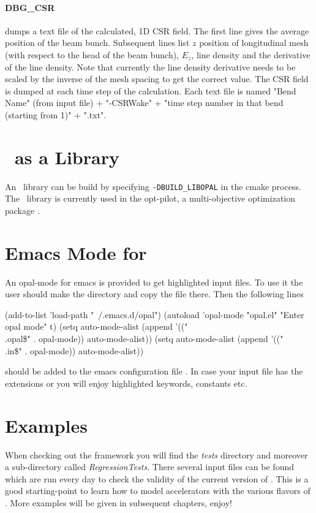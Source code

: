 \paragraph{DBG\_CSR} dumps a text file of the calculated, 1D CSR field. The first line gives the average position of the beam bunch.
Subsequent lines list $z$ position of longitudinal mesh (with respect to the head of the beam bunch), $E_z$, line density and the derivative of the line density. Note that currently the line density derivative needs to be scaled by the inverse of the mesh spacing to get the correct value. The CSR field
is dumped at each time step of the calculation. Each text file is named "Bend Name" (from input file) + "-CSRWake" + "time step number in that bend
(starting from 1)" + ".txt".

\section{\opal~as a Library}
An \opal~library can be build by specifying \texttt{-DBUILD\_LIBOPAL} in the cmake process. The \opal~library is currently used in the opt-pilot, a multi-objective
optimization package \cite{bib:optpilot1}.

\section{Emacs Mode for \opal}
An opal-mode for emacs is provided to get highlighted input files. To use it the user should make the directory  and copy the file  there. Then the following lines
\begin{footnotesize}
\begin{example}
(add-to-list 'load-path "~/.emacs.d/opal")
(autoload 'opal-mode "opal.el" "Enter opal mode" t)
(setq auto-mode-alist (append '(("\\.opal\$" . opal-mode)) auto-mode-alist))
(setq auto-mode-alist (append '(("\\.in\$" . opal-mode)) auto-mode-alist))
\end{example}
\end{footnotesize}
should be added to the emacs configuration file . In case your input file has the extensions  or   you will enjoy highlighted
keywords, constants etc.

\section{Examples}
When checking out the \opal framework you will find the \emph{tests} directory and moreover
a sub-directory called \emph{RegressionTests}. There several input files can be found which are
run every day to check the validity of the current version of \opal. This is a good starting-point to learn how to
model accelerators with the various flavors of \opal. More examples will be given in subsequent chapters, enjoy!

